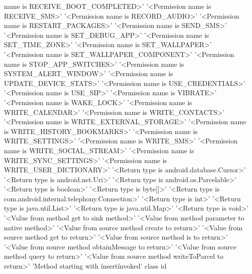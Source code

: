 name is RECEIVE_BOOT_COMPLETED>'	'<Permission name is RECEIVE_SMS>'	'<Permission name is RECORD_AUDIO>'	'<Permission name is RESTART_PACKAGES>'	'<Permission name is SEND_SMS>'	'<Permission name is SET_DEBUG_APP>'	'<Permission name is SET_TIME_ZONE>'	'<Permission name is SET_WALLPAPER>'	'<Permission name is SET_WALLPAPER_COMPONENT>'	'<Permission name is STOP_APP_SWITCHES>'	'<Permission name is SYSTEM_ALERT_WINDOW>'	'<Permission name is UPDATE_DEVICE_STATS>'	'<Permission name is USE_CREDENTIALS>'	'<Permission name is USE_SIP>'	'<Permission name is VIBRATE>'	'<Permission name is WAKE_LOCK>'	'<Permission name is WRITE_CALENDAR>'	'<Permission name is WRITE_CONTACTS>'	'<Permission name is WRITE_EXTERNAL_STORAGE>'	'<Permission name is WRITE_HISTORY_BOOKMARKS>'	'<Permission name is WRITE_SETTINGS>'	'<Permission name is WRITE_SMS>'	'<Permission name is WRITE_SOCIAL_STREAM>'	'<Permission name is WRITE_SYNC_SETTINGS>'	'<Permission name is WRITE_USER_DICTIONARY>'	'<Return type is android.database.Cursor>'	'<Return type is android.net.Uri>'	'<Return type is android.os.Parcelable>'	'<Return type is boolean>'	'<Return type is byte[]>'	'<Return type is com.android.internal.telephony.Connection>'	'<Return type is int>'	'<Return type is java.util.List>'	'<Return type is java.util.Map>'	'<Return type is void>'	'<Value from method get to sink method>'	'<Value from method parameter to native method>'	'<Value from source method create to return>'	'<Value from source method get to return>'	'<Value from source method is to return>'	'<Value from source method obtainMessage to return>'	'<Value from source method query to return>'	'<Value from source method writeToParcel to return>'	'Method starting with \'insert\' invoked'	class	id
